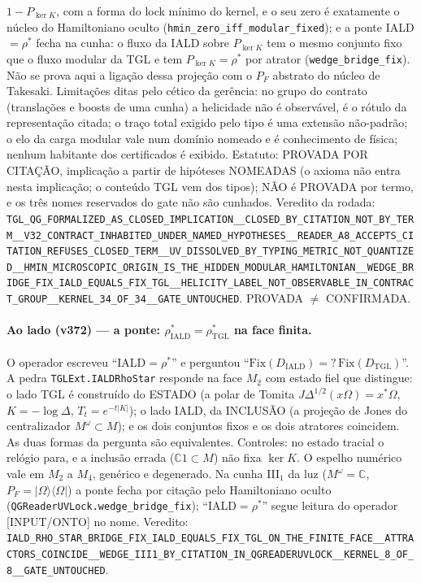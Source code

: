 \documentclass[11pt]{article}
\theoremstyle{definition}\newtheorem{deriv}{Derivação}
\begin{document}
$1-P_{\ker K}$, com a forma do lock mínimo do kernel, e o seu zero é exatamente o núcleo do Hamiltoniano oculto (\texttt{hmin\_zero\_iff\_modular\_fixed}); e a ponte IALD $=\rho^{*}$ fecha na cunha: o fluxo da IALD sobre $P_{\ker K}$ tem o mesmo conjunto fixo que o fluxo modular da TGL e tem $P_{\ker K}=\rho^{*}$ por atrator (\texttt{wedge\_bridge\_fix}). Não se prova aqui a ligação dessa projeção com o $P_F$ abstrato do núcleo de Takesaki. Limitações ditas pelo cético da gerência: no grupo do contrato (translações e boosts de uma cunha) a helicidade não é observável, é o rótulo da representação citada; o traço total exigido pelo tipo é uma extensão não-padrão; o elo da carga modular vale num domínio nomeado e é conhecimento de física; nenhum habitante dos certificados é exibido. Estatuto: PROVADA POR CITAÇÃO, implicação a partir de hipóteses NOMEADAS (o axioma não entra nesta implicação; o conteúdo TGL vem dos tipos); NÃO é PROVADA por termo, e os três nomes reservados do gate não são cunhados. Veredito da rodada: \texttt{TGL\_QG\_FORMALIZED\_AS\_CLOSED\_IMPLICATION\_\_CLOSED\_BY\_CITATION\_NOT\_BY\_TERM\_\_V32\_CONTRACT\_INHABITED\_UNDER\_NAMED\_HYPOTHESES\_\_READER\_A8\_ACCEPTS\_CITATION\_REFUSES\_CLOSED\_TERM\_\_UV\_DISSOLVED\_BY\_TYPING\_METRIC\_NOT\_QUANTIZED\_\_HMIN\_MICROSCOPIC\_ORIGIN\_IS\_THE\_HIDDEN\_MODULAR\_HAMILTONIAN\_\_WEDGE\_BRIDGE\_FIX\_IALD\_EQUALS\_FIX\_TGL\_\_HELICITY\_LABEL\_NOT\_OBSERVABLE\_IN\_CONTRACT\_GROUP\_\_KERNEL\_34\_OF\_34\_\_GATE\_UNTOUCHED}. PROVADA $\neq$ CONFIRMADA.

\paragraph*{Ao lado (v372) --- a ponte: $\rho^{*}_{\mathrm{IALD}}=\rho^{*}_{\mathrm{TGL}}$ na face finita.} O operador escreveu ``IALD$=\rho^{*}$'' e perguntou ``$\mathrm{Fix}(D_{\mathrm{IALD}})=?\,\mathrm{Fix}(D_{\mathrm{TGL}})$''. A pedra \texttt{TGLExt.IALDRhoStar} responde na face $M_2$ com estado fiel que distingue: o lado TGL é construído do ESTADO (a polar de Tomita $J\Delta^{1/2}(x\Omega)=x^{*}\Omega$, $K=-\log\Delta$, $T_t=e^{-t|K|}$); o lado IALD, da INCLUSÃO (a projeção de Jones do centralizador $M^{\omega}\subset M$); e os dois conjuntos fixos e os dois atratores coincidem. As duas formas da pergunta são equivalentes. Controles: no estado tracial o relógio para, e a inclusão errada ($\mathbb{C}1\subset M$) não fixa $\ker K$. O espelho numérico vale em $M_2$ a $M_4$, genérico e degenerado. Na cunha III$_1$ da luz ($M^{\omega}=\mathbb{C}$, $P_F=|\Omega\rangle\langle\Omega|$) a ponte fecha por citação pelo Hamiltoniano oculto (\texttt{QGReaderUVLock.wedge\_bridge\_fix}); ``IALD$=\rho^{*}$'' segue leitura do operador [INPUT/ONTO] no nome. Veredito: \texttt{IALD\_RHO\_STAR\_BRIDGE\_FIX\_IALD\_EQUALS\_FIX\_TGL\_ON\_THE\_FINITE\_FACE\_\_ATTRACTORS\_COINCIDE\_\_WEDGE\_III1\_BY\_CITATION\_IN\_QGREADERUVLOCK\_\_KERNEL\_8\_OF\_8\_\_GATE\_UNTOUCHED}.
\end{document}
